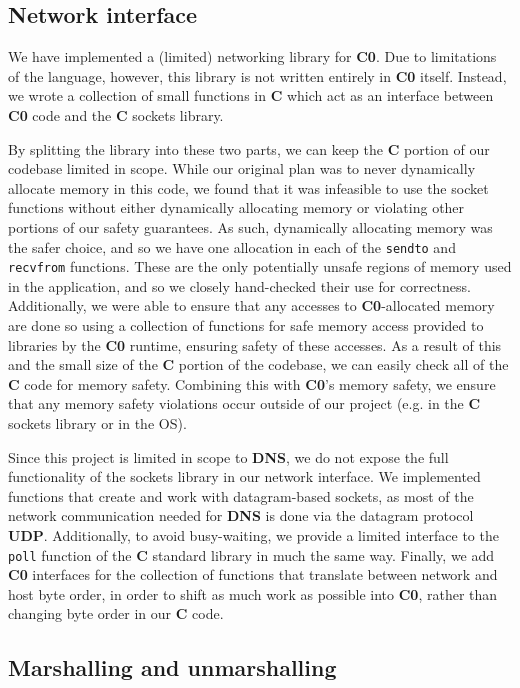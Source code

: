 \documentclass{article}
\newcommand\Kwd[1]{{\sffamily\bfseries{#1}}}
\begin{document}
\subsection{Network interface}\label{sec:network-interface}

We have implemented a (limited) networking library for \Kwd{C0}. Due to limitations of the language, however, this library is not written entirely in \Kwd{C0} itself. Instead, we wrote a collection of small functions in \Kwd{C} which act as an interface between \Kwd{C0} code and the \Kwd{C} sockets library.

By splitting the library into these two parts, we can keep the \Kwd{C} portion of our codebase limited in scope. While our original plan was to never dynamically allocate memory in this code, we found that it was infeasible to use the socket functions without either dynamically allocating memory or violating other portions of our safety guarantees. As such, dynamically allocating memory was the safer choice, and so we have one allocation in each of the \texttt{sendto} and \texttt{recvfrom} functions. These are the only potentially unsafe regions of memory used in the application, and so we closely hand-checked their use for correctness. Additionally, we were able to ensure that any accesses to \Kwd{C0}-allocated memory are done so  using a collection of functions for safe memory access provided to libraries by the \Kwd{C0} runtime, ensuring safety of these accesses. As a result of this and the small size of the \Kwd{C} portion of the codebase, we can easily check all of the \Kwd{C} code for memory safety. Combining this with \Kwd{C0}'s memory safety, we ensure that any memory safety violations occur outside of our project (e.g. in the \Kwd{C} sockets library or in the OS).

Since this project is limited in scope to \Kwd{DNS}, we do not expose the full functionality of the sockets library in our network interface. We implemented functions that create and work with datagram-based sockets, as most of the network communication needed for \Kwd{DNS} is done via the datagram protocol \Kwd{UDP}. Additionally, to avoid busy-waiting, we provide a limited interface to the \texttt{poll} function of the \Kwd{C} standard library in much the same way. Finally, we add \Kwd{C0} interfaces for the collection of functions that translate between network and host byte order, in order to shift as much work as possible into \Kwd{C0}, rather than changing byte order in our \Kwd{C} code.

\subsection{Marshalling and unmarshalling}
\end{document}
